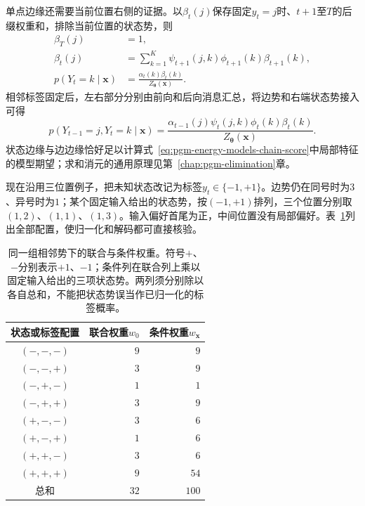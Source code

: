 单点边缘还需要当前位置右侧的证据。以$\beta_t(j)$保存固定$y_t=j$时、$t+1$至$T$的后缀权重和，排除当前位置的状态势，则
\begin{equation}
  \begin{aligned}
    \beta_T(j)&=1,\\
    \beta_t(j)&=\sum_{k=1}^K
         \psi_{t+1}(j,k)\phi_{t+1}(k)\beta_{t+1}(k),\\
    p(Y_t=k\mid\bm{x})
      &=\frac{\alpha_t(k)\beta_t(k)}{Z_{\bm{\theta}}(\bm{x})}.
  \end{aligned}
  \label{eq:pgm-energy-models-backward}
\end{equation}
相邻标签固定后，左右部分分别由前向和后向消息汇总，将边势和右端状态势接入可得
\begin{equation}
  p(Y_{t-1}=j,Y_t=k\mid\bm{x})
   =\frac{\alpha_{t-1}(j)\psi_t(j,k)
                   \phi_t(k)\beta_t(k)}
          {Z_{\bm{\theta}}(\bm{x})}.
  \label{eq:pgm-energy-models-edge-marginal}
\end{equation}
状态边缘与边边缘恰好足以计算式~\eqref{eq:pgm-energy-models-chain-score}中局部特征的模型期望；求和消元的通用原理见第~\ref{chap:pgm-elimination}章。

现在沿用三位置例子，把未知状态改记为标签$y_t\in\{-1,+1\}$。边势仍在同号时为$3$、异号时为$1$；某个固定输入给出的状态势，按$(-1,+1)$排列，三个位置分别取$(1,2)$、$(1,1)$、$(1,3)$。输入偏好首尾为正，中间位置没有局部偏好。表~\ref{tab:pgm-energy-models-chain-weights}列出全部配置，使归一化和解码都可直接核验。

\begin{table}[htbp]
  \centering
  \begin{tabular}{crr}
    \toprule
    状态或标签配置 & 联合权重$w_0$ & 条件权重$w_{\bm{x}}$\\
    \midrule
    $(-,-,-)$ & $9$ & $9$\\
    $(-,-,+)$ & $3$ & $9$\\
    $(-,+,-)$ & $1$ & $1$\\
    $(-,+,+)$ & $3$ & $9$\\
    $(+,-,-)$ & $3$ & $6$\\
    $(+,-,+)$ & $1$ & $6$\\
    $(+,+,-)$ & $3$ & $6$\\
    $(+,+,+)$ & $9$ & $54$\\
    \midrule
    总和 & $32$ & $100$\\
    \bottomrule
  \end{tabular}
  \caption{同一组相邻势下的联合与条件权重。符号$+$、$-$分别表示$+1$、$-1$；条件列在联合列上乘以固定输入给出的三项状态势。两列须分别除以各自总和，不能把状态势误当作已归一化的标签概率。}
  \label{tab:pgm-energy-models-chain-weights}
\end{table}

